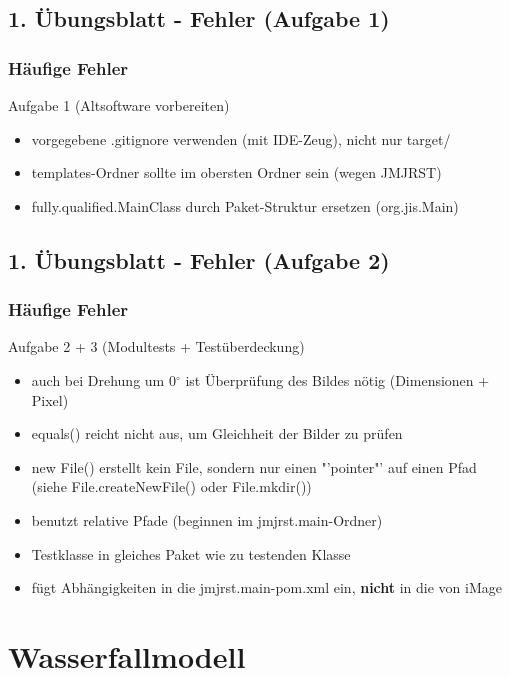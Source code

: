 \documentclass[18pt]{beamer}
\begin{document}
	\subsection{1. Übungsblatt - Fehler (Aufgabe 1)}
	\begin{frame}
		\frametitle{Häufige Fehler}
		\begin{block}{Aufgabe 1 (Altsoftware vorbereiten)}
		\begin{itemize}
			\item vorgegebene .gitignore verwenden (mit IDE-Zeug), nicht nur target/ \pause
			\item templates-Ordner sollte im obersten Ordner sein (wegen JMJRST) \pause
			\item fully.qualified.MainClass durch Paket-Struktur ersetzen (org.jis.Main)
		\end{itemize}
		\end{block}
	\end{frame}
	
	\subsection{1. Übungsblatt - Fehler (Aufgabe 2)}
	\begin{frame}
		\frametitle{Häufige Fehler}
		\begin{block}{Aufgabe 2 + 3 (Modultests + Testüberdeckung)}
			\begin{itemize}
				\item auch bei Drehung um 0$^{\circ}$  ist Überprüfung des Bildes nötig (Dimensionen + Pixel) \pause
				\item equals() reicht nicht aus, um Gleichheit der Bilder zu prüfen \pause 
				\item new File() erstellt kein File, sondern nur einen "'pointer"' auf einen Pfad (siehe File.createNewFile() oder File.mkdir()) \pause
				\item benutzt relative Pfade (beginnen im jmjrst.main-Ordner) \pause 
				\item Testklasse in gleiches Paket wie zu testenden Klasse \pause 
				\item fügt Abhängigkeiten in die jmjrst.main-pom.xml ein, \textbf{nicht} in die von iMage 
			\end{itemize}
		\end{block}
	\end{frame}

\section{Wasserfallmodell}
\end{document}
